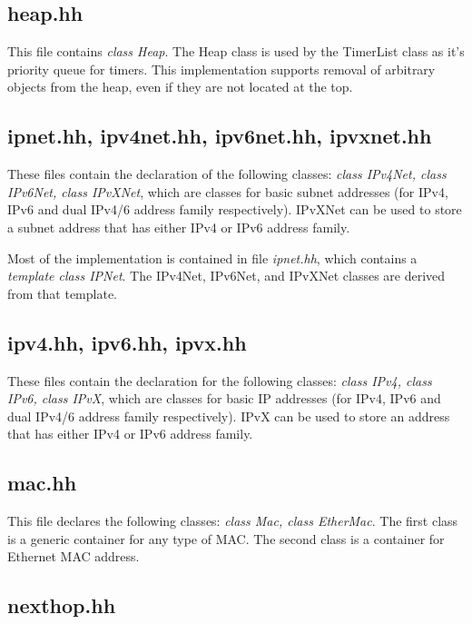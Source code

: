 \documentclass[11pt]{article}
\begin{document}
\subsection{heap.hh}

This file contains \emph{class Heap}.  The Heap class is used by the
TimerList class as it's priority queue for timers. This implementation
supports removal of arbitrary objects from the heap, even if they are
not located at the top.

\subsection{ipnet.hh, ipv4net.hh, ipv6net.hh, ipvxnet.hh}

These files contain the declaration of the following classes:
\emph{class IPv4Net, class IPv6Net, class IPvXNet}, which are
classes for basic subnet addresses (for IPv4, IPv6 and dual IPv4/6
address family respectively). IPvXNet can be used to store a subnet
address that has either IPv4 or IPv6 address family.

Most of the implementation is contained in file \emph{ipnet.hh}, which
contains a \emph{template class IPNet}. The IPv4Net, IPv6Net, and
IPvXNet classes are derived from that template.

\subsection{ipv4.hh, ipv6.hh, ipvx.hh}

These files contain the declaration for the following classes:
\emph{class IPv4, class IPv6, class IPvX}, which are
classes for basic IP addresses (for IPv4, IPv6 and dual IPv4/6
address family respectively). IPvX can be used to store an
address that has either IPv4 or IPv6 address family.

\subsection{mac.hh}

This file declares the following classes: \emph{class Mac, class
EtherMac}. The first class is a generic container for any type of MAC.
The second class is a container for Ethernet MAC address.

\subsection{nexthop.hh}
\end{document}
